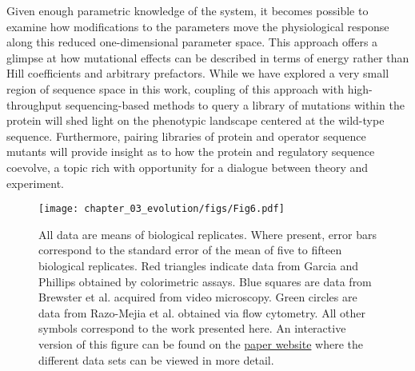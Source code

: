 Given enough parametric knowledge of the system, it
becomes possible to examine how modifications to the parameters move the
physiological response along this reduced one-dimensional parameter space.
This approach offers a glimpse at how mutational effects can be described in terms of
energy rather than Hill coefficients and arbitrary prefactors. While we have
explored a very small region of sequence space in this work, coupling of this
approach with high-throughput sequencing-based methods to query a library of
mutations within the protein will shed light on the phenotypic landscape
centered at the wild-type sequence. Furthermore, pairing libraries of protein
and operator sequence mutants will provide insight as to how the protein and
regulatory sequence coevolve, a topic rich with opportunity for a dialogue
between theory and experiment.

\begin{figure}
    \centering
    \texttt{[image: chapter\_03\_evolution/figs/Fig6.pdf]}
    \caption[Data collapse of the simple repression regulatory architecture.]{
    All data are means of biological replicates. Where present, error bars
    correspond to the standard error of the mean of five to fifteen
    biological replicates. Red triangles indicate data from Garcia and
    Phillips \cite{Garcia2011} obtained by colorimetric assays. Blue squares
    are data from Brewster et al.\cite{Brewster2014} acquired from video
    microscopy. Green circles are data from Razo-Mejia et al.
    \cite{Razo-Mejia2018} obtained via flow cytometry. All other symbols
    correspond to the work presented here. An interactive version of this
    figure can be found on the
    \href{https://www.rpgroup.caltech.edu/mwc_mutants}{paper website} where the different data sets can be viewed in more detail.}
    \label{fig:all_data_collapse}
\end{figure}  